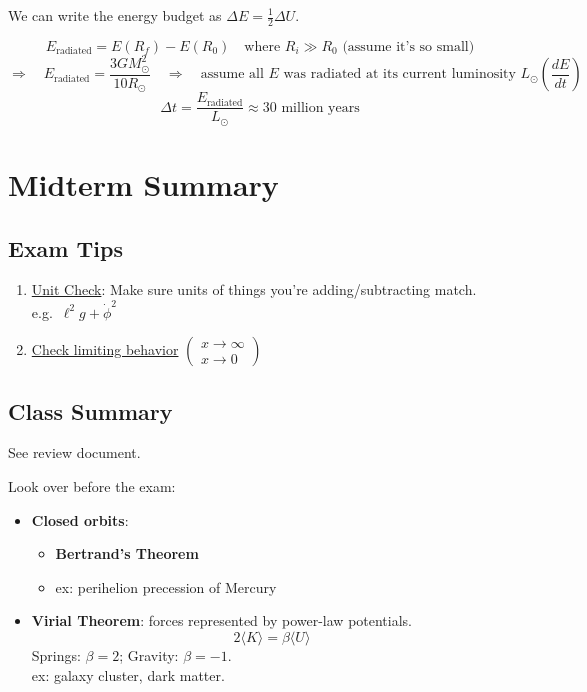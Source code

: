 We can write the energy budget as $\Delta E = \tfrac{1}{2}\Delta U$.

\[
    E_\text{radiated} = E(R_f) - E(R_0) \quad\text{where }R_i \gg R_0
    \text{ (assume it's so small)}
\]
\[
    \Rightarrow\quad E_\text{radiated} = \frac{3GM_\odot^2}{10R_\odot}
    \quad\Rightarrow\quad \text{assume all $E$ was radiated at its current luminosity $L_\odot\!\left(\frac{dE}{dt}\right)$}
\]
\[
    \Delta t = \frac{E_\text{radiated}}{L_\odot} \approx 30\text{ million years}
\]


\chapter{Midterm Summary}

\section{Exam Tips}

\begin{enumerate}
    \item \underline{Unit Check}: Make sure units of things you're adding/subtracting match. \\
    e.g.\ $\ell^2 g + \dot\phi^2$ \quad [check!]

    \item \underline{Check limiting behavior} $\left(\begin{smallmatrix}x\to\infty \\ x\to 0\end{smallmatrix}\right)$
\end{enumerate}

\section{Class Summary}

See review document.

Look over before the exam:
\begin{itemize}
    \item \textbf{Closed orbits}:
    \begin{itemize}
        \item \textbf{Bertrand's Theorem}
        \item ex: perihelion precession of Mercury
    \end{itemize}
    \item \textbf{Virial Theorem}: forces represented by power-law potentials.
    \[
        2\langle K\rangle = \beta\langle U\rangle
    \]
    Springs: $\beta = 2$; Gravity: $\beta = -1$. \\
    ex: galaxy cluster, dark matter.
\end{itemize}

